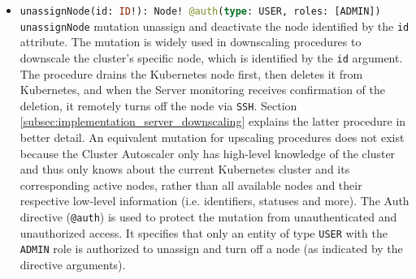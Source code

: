 \begin{itemize}
  \item \lstinline[language=graphql, deletekeywords={type}, morekeywords={[2]{Node, @auth}},
    morekeywords={[3]{USER, ADMIN}}, morekeywords={[4]{id, type, roles}},
    morekeywords={[5]{unassignNode}}]{unassignNode(id: ID!): Node! @auth(type: USER, roles: [ADMIN])}
    \newline
    \texttt{unassignNode} mutation unassign and deactivate the node identified by
    the \texttt{id} attribute.
    \newline
    The mutation is widely used in downscaling procedures to downscale the cluster's
    specific node, which is identified by the \texttt{id} argument. The
    procedure drains the Kubernetes node first, then deletes it from Kubernetes,
    and when the Server monitoring receives confirmation of the deletion, it remotely
    turns off the node via \texttt{SSH}. Section \ref{subsec:implementation_server_downscaling}
    explains the latter procedure in better detail.
    \newline
    An equivalent mutation for upscaling procedures does not exist because the
    Cluster Autoscaler only has high-level knowledge of the cluster and thus
    only knows about the current Kubernetes cluster and its corresponding active
    nodes, rather than all available nodes and their respective low-level information
    (i.e. identifiers, statuses and more).
    \newline
    The Auth directive (\texttt{@auth}) is used to protect the mutation from unauthenticated
    and unauthorized access. It specifies that only an entity of type \texttt{USER}
    with the \texttt{ADMIN} role is authorized to unassign and turn off a node (as
    indicated by the directive arguments).


\end{itemize}
